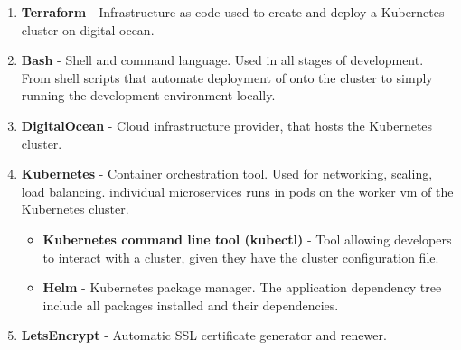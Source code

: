 \begin{enumerate}
    \item \textbf{Terraform} - Infrastructure as code used to create and deploy a Kubernetes cluster on digital ocean.
    \item \textbf{Bash} - Shell and command language. Used in all stages of development. From shell scripts that automate deployment of \mini onto the cluster to simply running the development environment locally.
    \item \textbf{DigitalOcean} - Cloud infrastructure provider, that hosts the Kubernetes cluster.
    \item \textbf{Kubernetes} - Container orchestration tool. Used for networking, scaling, load balancing. \mini individual microservices runs in pods on the worker vm of the Kubernetes cluster.
    \begin{itemize}
        \item \textbf{Kubernetes command line tool (kubectl)} - Tool allowing developers to interact with a cluster, given they have the cluster configuration file.
        \item \textbf{Helm} - Kubernetes package manager. The application dependency tree include all packages installed and their dependencies.
    \end{itemize}
    \item \textbf{LetsEncrypt} - Automatic SSL certificate generator and renewer.
\end{enumerate}



